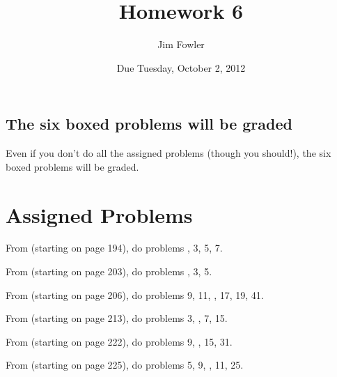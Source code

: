 \documentclass[12pt]{handout}
\title{Homework 6}
\date{Due Tuesday, October  2, 2012}
\author{Jim Fowler}
\begin{document}
\maketitle










\subsection*{The six boxed problems will be graded}
Even if you don't do all the assigned problems (though you should!), the six boxed problems will be graded.

\section*{Assigned Problems}

From  (starting on page 194),
do problems , 3, 5, 7.
\vspace{1ex}

From  (starting on page 203),
do problems , 3, 5.
\vspace{1ex}

From  (starting on page 206),
do problems 9, 11, , 17, 19, 41.
\vspace{1ex}

From  (starting on page 213),
do problems 3, , 7, 15.
\vspace{1ex}

From  (starting on page 222),
do problems 9, , 15, 31.
\vspace{1ex}

From  (starting on page 225),
do problems 5, 9, , 11, 25.
\vspace{1ex}
\end{document}
